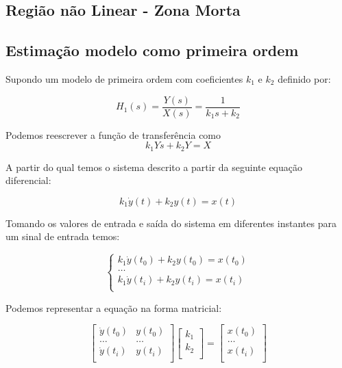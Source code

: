 \documentclass[a4paper,11pt]{article}
\begin{document}
\subsection{Região não Linear - Zona Morta}


\subsection{Estimação modelo como primeira ordem}

Supondo um modelo de primeira ordem com coeficientes $k_1$ e $k_2$ definido por:

\begin{equation}
    H_1(s) = \frac{Y(s)}{X(s)} = \frac{1}{k_1 s+ k_2}
\end{equation}


Podemos reescrever a função de transferência como
\begin{equation}
k_1 Ys + k_2 Y  = X
\end{equation}

A partir do qual temos o sistema descrito a partir da seguinte equação diferencial:

\begin{equation}
k_1 \dot{y}(t) + k_2 y(t) = x(t)
\end{equation}

Tomando os valores de entrada e saída do sistema em diferentes instantes para um sinal de entrada temos:

\begin{equation}
\left\{\begin{array}{c}
    k_1 \dot{y}(t_0) + k_2 y(t_0) = x(t_0)  \\
    \dots\\
    k_1 \dot{y}(t_i) + k_2 y(t_i) = x(t_i)  \\
\end{array} \right.
\end{equation}


Podemos representar a equação na forma matricial:

\begin{equation}
\left[\begin{array}{cc}
    \dot{y}(t_0) & y(t_0)\\
    \dots  & \dots \\
    \dot{y}(t_i) & y(t_i)\\
\end{array} \right]
\left[\begin{array}{c}
    k_1\\
    k_2\\
\end{array} \right]
=
\left[\begin{array}{c}
    x(t_0)  \\
    \dots\\
    x(t_i)  \\
\end{array} \right]
\end{equation}
\end{document}
